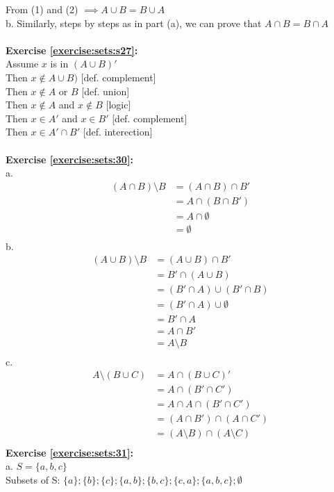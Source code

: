 From (1) and (2) $\implies A\cup B = B\cup A$\\
b. Similarly, steps by steps as in part (a), we can prove that $A\cap B=B\cap A$\\
\\
\textbf{Exercise \ref{exercise:sets:s27}:}\\
Assume $x$ is in $(A\cup B)'$\\
Then $x \notin A \cup B)$ [def. complement]\\
Then $x \notin A$ or $B$ [def. union]\\
Then $x \notin A$ and $x \notin B$ [logic]\\
Then $x \in A'$ and $x \in B'$ [def. complement]\\
Then $x \in A' \cap B'$ [def. interection]\\
\\
\textbf{Exercise \ref{exercise:sets:30}:}\\
a.\begin{align*}
(A\cap B) \setminus B & =(A\cap B)\cap B'\\
& = A\cap (B\cap B')\\
& = A\cap \emptyset\\
& = \emptyset\\
\end{align*}
b.\begin{align*}
(A\cup B) \setminus B & =(A\cup B)\cap B'\\
& = B'\cap (A\cup B)\\
& = (B'\cap A)\cup(B'\cap B)\\
& = (B'\cap A)\cup \emptyset\\
& = B'\cap A\\
& = A\cap B'\\
& = A\setminus B\\
\end{align*}
c.\begin{align*}
A\setminus (B\cup C) & =A\cap (B\cup C)'\\
& = A\cap (B'\cap C')\\
& = A\cap A\cap(B'\cap C')\\
& = (A\cap B')\cap (A\cap C')\\
& = (A\setminus B)\cap (A\setminus C)\\
\end{align*}
\textbf{Exercise \ref{exercise:sets:31}:}\\
a. $S=\{a,b,c\}$\\
Subsets of S: $\{a\};\{b\};\{c\};\{a,b\};\{b,c\};\{c,a\};\{a,b,c\};\emptyset$\\
